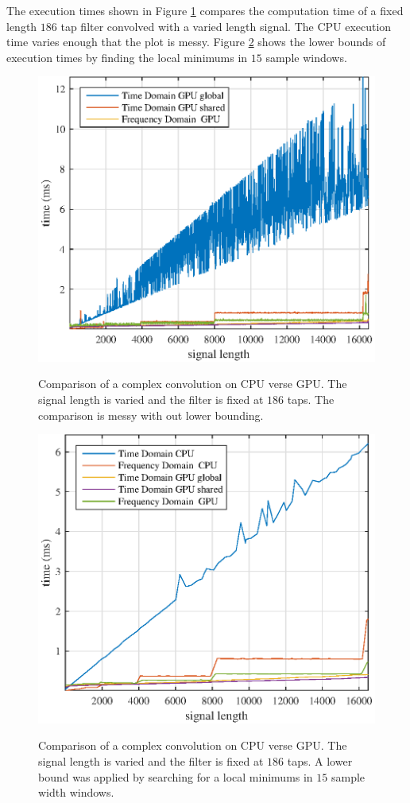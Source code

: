 The execution times shown in Figure \ref{fig:CPUvsGPU_1batch_186taps_varySignal_noMin} compares the computation time of a fixed length $186$ tap filter convolved with a varied length signal.
The CPU execution time varies enough that the plot is messy.
Figure \ref{fig:CPUvsGPU_1batch_186taps_varySignal} shows the lower bounds of execution times by finding the local minimums in $15$ sample windows.
\begin{figure}
	\centering\includegraphics[width=5in]{figures/gpu_intro/CPUvsGPU_1batch_186taps_varySignal_noMin.eps}
	\label{fig:CPUvsGPU_1batch_186taps_varySignal_noMin}
	\caption{Comparison of a complex convolution on CPU verse GPU. The signal length is varied and the filter is fixed at $186$ taps. The comparison is messy with out lower bounding.}
\end{figure}
\begin{figure}
	\centering\includegraphics[width=5in]{figures/gpu_intro/CPUvsGPU_1batch_186taps_varySignal.eps}
	\label{fig:CPUvsGPU_1batch_186taps_varySignal}
	\caption{Comparison of a complex convolution on CPU verse GPU. The signal length is varied and the filter is fixed at $186$ taps. A lower bound was applied by searching for a local minimums in $15$ sample width windows.}
\end{figure}

